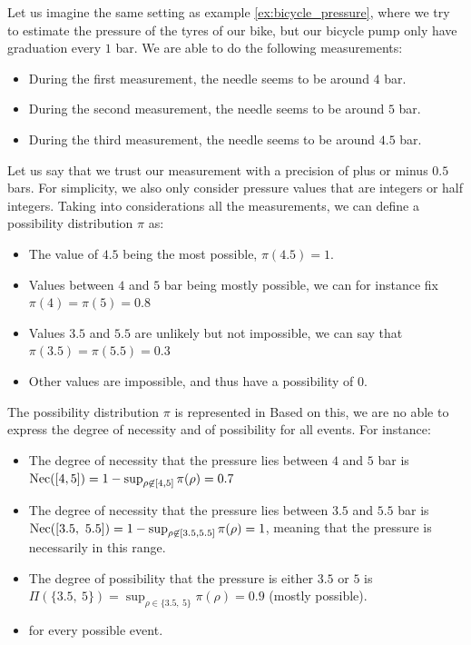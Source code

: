 \begin{example}\label{ex:bicycle_pressure_possibility}
    Let us imagine the same setting as example \ref{ex:bicycle_pressure}, where we try to estimate the pressure of the tyres of our bike, but our bicycle pump only have graduation every $1$ bar. We are able to do the following measurements:
    \begin{itemize}
        \item During the first measurement, the needle seems to be around $4$ bar.
        \item During the second measurement, the needle seems to be around $5$ bar.
        \item During the third measurement, the needle seems to be around $4.5$ bar.
    \end{itemize}
    Let us say that we trust our measurement with a precision of plus or minus $0.5$ bars. For simplicity, we also only consider pressure values that are integers or half integers. Taking into considerations all the measurements, we can define a possibility distribution $\pi$ as:
    \begin{itemize}
        \item The value of $4.5$ being the most possible, $\pi(4.5)=1$.
        \item Values between $4$ and $5$ bar being mostly possible, we can for instance fix $\pi(4)=\pi(5)=0.8$
        \item Values $3.5$ and $5.5$ are unlikely but not impossible, we can say that $\pi(3.5)=\pi(5.5)=0.3$
        \item Other values are impossible, and thus have a possibility of $0$.
    \end{itemize}
    The possibility distribution $\pi$ is represented in 
    Based on this, we are no able to express the degree of necessity and of possibility for all events. For instance:
    \begin{itemize}
        \item The degree of necessity that the pressure lies between $4$ and $5$ bar is $\mathrm{Nec}([4, 5])=1-\sup_{\rho\not\in[4,5]}\pi(\rho)=0.7$
        \item The degree of necessity that the pressure lies between $3.5$ and $5.5$ bar is $\mathrm{Nec}([3.5,~ 5.5]) = 1-\sup_{\rho\not\in[3.5,5.5]}\pi(\rho) = 1$, meaning that the pressure is necessarily in this range.
        \item The degree of possibility that the pressure is either $3.5$ or  $5$ is $\Pi (\{3.5,~5\})=\sup_{\rho\in\{3.5,~5\}}\pi(\rho)=0.9$ (mostly possible).
        \item \etc for every possible event.
    \end{itemize}
\end{example}

